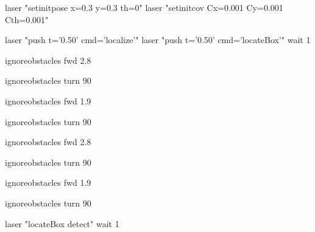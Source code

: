 laser "setinitpose x=0.3 y=0.3 th=0"
laser "setinitcov Cx=0.001 Cy=0.001 Cth=0.001"

laser "push t='0.50' cmd='localize'"
laser "push t='0.50' cmd='locateBox'"
wait 1



ignoreobstacles
fwd 2.8

ignoreobstacles
turn 90

ignoreobstacles
fwd 1.9

ignoreobstacles
turn 90

ignoreobstacles
fwd 2.8

ignoreobstacles
turn 90

ignoreobstacles
fwd 1.9

ignoreobstacles
turn 90

laser "locateBox detect"
wait 1